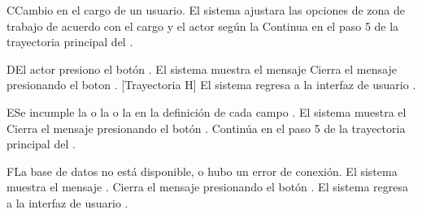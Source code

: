 \begin{UCtrayectoriaA}{C}{Cambio en el cargo de un usuario.}
    \UCpaso     El sistema ajustara las opciones de zona de trabajo de acuerdo con el cargo y el actor según la 
    \UCpaso     Continua en el paso 5 de la trayectoria principal del .
\end{UCtrayectoriaA}


\begin{UCtrayectoriaA}{D}{El actor presiono el botón .}
	\UCpaso El sistema muestra el mensaje 
	\UCpaso[\UCactor] Cierra el mensaje presionando el boton  . [Trayectoria H]
	\UCpaso El sistema regresa a la interfaz de usuario .
\end{UCtrayectoriaA}

\begin{UCtrayectoriaA}{E}{Se incumple la  o la   o la   en la definición de cada campo   .}
	\UCpaso El sistema muestra el 
	\UCpaso[\UCactor] Cierra el mensaje presionando el botón .
	\UCpaso Continúa en el paso 5 de la trayectoria principal del .
\end{UCtrayectoriaA}




\begin{UCtrayectoriaA}{F}{La base de datos no está disponible, o hubo un error de conexión.}
    \UCpaso El sistema muestra el mensaje .
    \UCpaso[\UCactor] Cierra el mensaje presionando el botón .
    \UCpaso El sistema regresa a la interfaz de usuario .
\end{UCtrayectoriaA}

